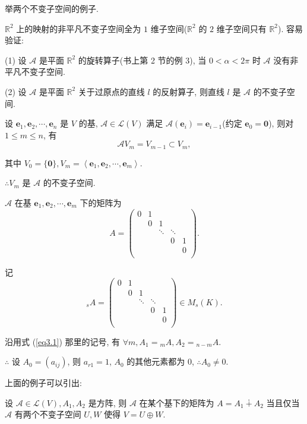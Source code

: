 \documentclass[color=black,device=normal,lang=cn,mode=geye]{elegantnote}
\begin{document}
举两个不变子空间的例子.
\begin{example}
    $\mathbb{R}^2$ 上的映射的非平凡不变子空间全为 $1$ 维子空间($\mathbb{R}^2$ 的 $2$ 维子空间只有 $\mathbb{R}^2$). 容易验证:
    
    (1) 设 $\mathcal{A}$ 是平面 $\mathbb{R}^2$ 的旋转算子(书上第 2 节的例 3), 当 $0<\alpha<2\pi$ 时 $\mathcal{A}$ 没有非平凡不变子空间.

    (2) 设 $\mathcal{A}$ 是平面 $\mathbb{R}^2$ 关于过原点的直线 $l$ 的反射算子, 则直线 $l$ 是 $\mathcal{A}$ 的不变子空间.
\end{example}
\begin{example}\label{exa3.2}
    设 $\boldsymbol{e}_1,\boldsymbol{e}_2,\cdots,\boldsymbol{e}_n$ 是 $V$ 的基, $\mathcal{A}\in\mathcal{L}(V)$ 满足 $\mathcal{A}(\boldsymbol{e}_i)=\boldsymbol{e}_{i-1}$(约定 $\boldsymbol{e}_0=\boldsymbol{0}$), 则对 $1\leq m\leq n$, 有
    \[\mathcal{A}V_m=V_{m-1}\subset V_m,\]

    其中 $V_0=\{\boldsymbol{0}\},V_m=\left<\boldsymbol{e}_1,\boldsymbol{e}_2,\cdots,\boldsymbol{e}_m\right>$.

    $\therefore V_m$ 是 $\mathcal{A}$ 的不变子空间.

    $\mathcal{A}$ 在基 $\boldsymbol{e}_1,\boldsymbol{e}_2,\cdots,\boldsymbol{e}_m$ 下的矩阵为
    \[A=\begin{pmatrix}
        0 & 1 \\
        & 0 & 1 \\
        && \ddots & \ddots \\
        &&& 0 & 1 \\
        &&&& 0 \\
    \end{pmatrix}.\]

    记
    \[{}_{s}A=\begin{pmatrix}
        0 & 1 \\
        & 0 & 1 \\
        && \ddots & \ddots \\
        &&& 0 & 1 \\
        &&&& 0 \\
    \end{pmatrix}\in M_s(K).\]

    沿用式 (\ref{eq3.1}) 那里的记号, 有 $\forall m,A_1={}_{m}A,A_2={}_{n-m}A$.

    $\therefore$ 设 $A_0=(a_{ij})$, 则 $a_{r1}=1$, $A_0$ 的其他元素都为 $0$, $\therefore A_0\neq0$.
\end{example}
上面的例子可以引出:
\begin{theorem}[书上的定理 2]
    设 $\mathcal{A}\in\mathcal{L}(V),A_1,A_2$ 是方阵, 则 $\mathcal{A}$ 在某个基下的矩阵为 $A=A_1\dotplus A_2$ 当且仅当 $\mathcal{A}$ 有两个不变子空间 $U,W$ 使得 $V=U\oplus W$.
\end{theorem}
\end{document}
